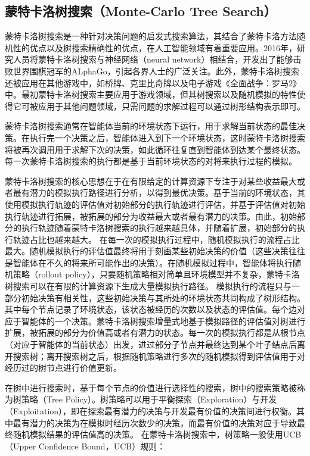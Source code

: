 \subsection{蒙特卡洛树搜索（Monte-Carlo Tree Search）}
蒙特卡洛树搜索是一种针对决策问题的启发式搜索算法\cite{DBLP:conf/aiide/ChaslotBSS08,chaslot2006monte,DBLP:conf/ecml/KocsisS06}，其结合了蒙特卡洛方法随机性的优点以及树搜索精确性的优点，在人工智能领域有着重要应用。2016年，研究人员将蒙特卡洛树搜索与神经网络（neural network）相结合，开发出了能够击败世界围棋冠军的ALphaGo\cite{DBLP:journals/nature/SilverHMGSDSAPL16}，引起各界人士的广泛关注。此外，蒙特卡洛树搜索还被应用在其他游戏中，如桥牌、克里比奇牌以及电子游戏《全面战争：罗马2》中。最初蒙特卡洛树搜索主要应用于游戏领域，但其树搜索以及随机模拟的特性使得它可被应用于其他问题领域，只需问题的求解过程可以通过树形结构表示即可。

蒙特卡洛树搜索通常在智能体当前的环境状态下运行，用于求解当前状态的最佳决策。在执行完一个决策之后，智能体进入到下一个环境状态，这时蒙特卡洛树搜索将被再次调用用于求解下次的决策，如此循环往复直到智能体到达某个最终状态。每一次蒙特卡洛树搜索的执行都是基于当前环境状态的对将来执行过程的模拟。

蒙特卡洛树搜索的核心思想在于在有限给定的计算资源下专注于对某些收益最大或者最有潜力的模拟执行路径进行分析，以得到最优决策。基于当前的环境状态，其使用模拟执行轨迹的评估值对初始部分的执行轨迹进行评估，并基于评估值对初始执行轨迹进行拓展，被拓展的部分为收益最大或者最有潜力的决策。由此，初始部分的执行轨迹随着蒙特卡洛树搜索的执行越来越具体，并随着扩展，初始部分的执行轨迹占比也越来越大。
在每一次的模拟执行过程中，随机模拟执行的流程占比最大。随机模拟执行的评估值最终将用于刻画某些初始决策的价值（这些决策往往是智能体在不久的将来所可能作出的决策）。在随机模拟过程中，智能体将执行随机策略（rollout policy），只要随机策略相对简单且环境模型并不复杂，蒙特卡洛树搜索可以在有限的计算资源下生成大量模拟执行路径。
模拟执行的流程只与一部分初始决策有相关性，这些初始决策与其所处的环境状态共同构成了树形结构。其中每个节点记录了环境状态，该状态被经历的次数以及状态的评估值。每个边对应于智能体的一个决策。蒙特卡洛树搜索增量式地基于模拟路径的评估值对树进行扩展，被拓展的部分为价值高或者有潜力的状态。每一次的模拟执行都是从根节点（对应于智能体的当前状态）出发，进过部分子节点并最终达到某个叶子结点后离开搜索树；离开搜索树之后，根据随机策略进行多次的随机模拟得到评估值用于对经历过的树节点进行价值更新。

%
在树中进行搜索时，基于每个节点的价值进行选择性的搜索，树中的搜索策略被称为树策略（Tree Policy）。树策略可以用于平衡探索（Exploration）与开发（Exploitation），即在探索最有潜力的决策与开发最有价值的决策间进行权衡。其中最有潜力的决策为在模拟时经历次数少的决策，而最有价值的决策对应于导致最终随机模拟结果的评估值高的决策。
在蒙特卡洛树搜索中，树策略一般使用UCB（Upper Confidence Bound，UCB）\cite{DBLP:journals/ml/AuerCF02}规则：

